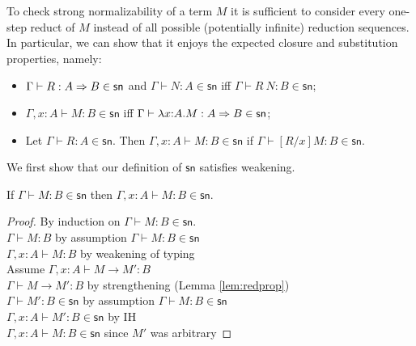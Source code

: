 \documentclass{article}
\newcommand{\csn}{\mathsf{sn}}
\newcommand{\red}{\longrightarrow}
\begin{document}
To check strong normalizability of a term $M$ it is sufficient to consider every one-step
reduct of $M$ instead of all possible (potentially infinite) reduction sequences. In particular, we can show that it enjoys the expected closure and substitution properties, namely:
\begin{itemize}
\item $\Gamma \vdash R : A \arrow B \in \csn$ and $\Gamma \vdash N : A \in \csn$
    iff $\Gamma \vdash R~N : B \in \csn$;
  \item $\Gamma, x{:}A \vdash M : B \in \csn$ iff $\Gamma \vdash  \lambda x{:}A.M : A \arrow B \in \csn$;
  \item Let  $\Gamma \vdash R : A \in
   \csn$. Then $\Gamma, x{:}A \vdash M : B \in \csn$ if $\Gamma \vdash [R/x]M : B \in \csn$.
\end{itemize}

We first show that our definition of $\csn$ satisfies weakening.

\begin{lemma}
If $\Gamma \vdash M : B \in \csn$ then $\Gamma, x{:}A \vdash M : B \in \csn$.
\end{lemma}
\begin{proof}
By induction on $\Gamma \vdash M : B \in \csn$.
 \\[1em]
$\Gamma \vdash M : B$ \hfill by assumption $\Gamma \vdash M : B \in \csn$\\
$\Gamma, x{:}A \vdash M : B$ \hfill by weakening of typing\\
Assume $\Gamma, x{:}A \vdash M \red M' : B$\\
$\Gamma \vdash M \red M' : B$ \hfill by strengthening (Lemma \ref{lem:redprop}) \\
$\Gamma \vdash M' : B \in \csn$ \hfill by assumption $\Gamma \vdash M : B \in \csn$\\
$\Gamma, x{:}A \vdash M' : B \in \csn$  \hfill by IH\\
$\Gamma, x{:}A \vdash M : B \in \csn$ \hfill since $M'$ was arbitrary

\end{proof}
\end{document}
